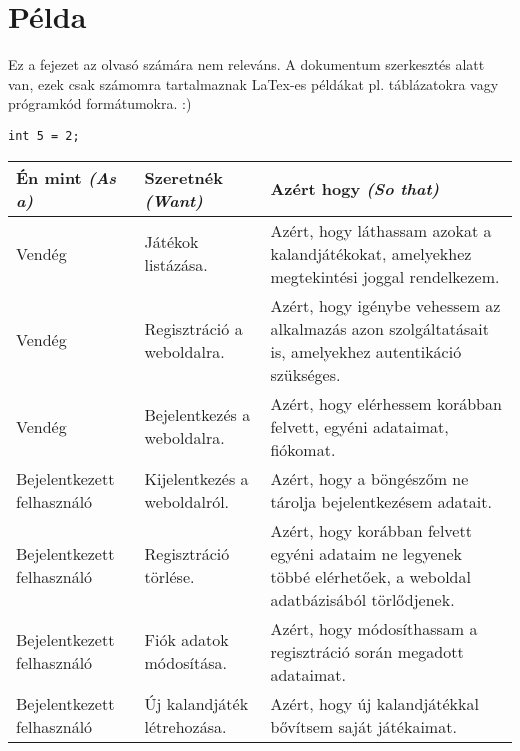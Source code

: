 \chapter{Példa} %
\label{ch:impl}

Ez a fejezet az olvasó számára nem releváns. A dokumentum szerkesztés alatt van, ezek csak számomra tartalmaznak LaTex-es példákat pl. táblázatokra vagy prógramkód formátumokra. :)

\begin{lstlisting}
int 5 = 2;
\end{lstlisting}
\begin{center}
	\begin{longtable}{ | m{} | 	m{} |m{}| }
		\hline
		\textbf{Én mint \newline \textit{(As a)}} & \textbf{Szeretnék \newline \textit{(Want)}} & \textbf{Azért hogy \newline \textit{(So that)}} \\
		\hline \hline
		
		Vendég & Játékok listázása. & Azért, hogy láthassam azokat a kalandjátékokat, amelyekhez megtekintési joggal rendelkezem. \\
		\hline
		
		Vendég & Regisztráció a weboldalra. & Azért, hogy igénybe vehessem az alkalmazás azon szolgáltatásait is, amelyekhez autentikáció szükséges. \\
		\hline
		
		Vendég &  Bejelentkezés a weboldalra. & Azért, hogy elérhessem korábban felvett, egyéni adataimat, fiókomat.\\
		\hline
		
		Bejelentkezett felhasználó & Kijelentkezés a weboldalról. & Azért, hogy a böngészőm ne tárolja bejelentkezésem adatait.\\
		\hline
		
		Bejelentkezett felhasználó & Regisztráció törlése.& Azért, hogy korábban felvett egyéni adataim ne legyenek többé elérhetőek, a weboldal adatbázisából törlődjenek.\\
		\hline
		
		Bejelentkezett felhasználó & Fiók adatok módosítása. & Azért, hogy módosíthassam a regisztráció során megadott adataimat.\\
		\hline
		
		Bejelentkezett felhasználó & Új kalandjáték létrehozása. & Azért, hogy új kalandjátékkal bővítsem saját játékaimat.\\
		\hline
		

\end{longtable}
\end{center}
